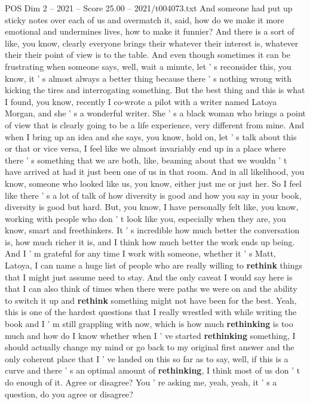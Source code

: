\begin{textsample}{POS Dim 2 – 2021 – Score 25.00 – 2021/t004073.txt}
And someone had put up sticky notes over each of us and overmatch it, said, how do we make it more emotional and undermines lives, how to make it funnier?
And there is a sort of like, you know, clearly everyone brings their whatever their interest is, whatever their their point of view is to the table.
And even though sometimes it can be frustrating when someone says, well, wait a minute, let ' s reconsider this, you know, it ' s almost always a better thing because there ' s nothing wrong with kicking the tires and interrogating something.
But the best thing and this is what I found, you know, recently I co-wrote a pilot with a writer named Latoya Morgan, and she ' s a wonderful writer.
She ' s a black woman who brings a point of view that is clearly going to be a life experience, very different from mine.
And when I bring up an idea and she says, you know, hold on, let ' s talk about this or that or vice versa, I feel like we almost invariably end up in a place where there ' s something that we are both, like, beaming about that we wouldn ' t have arrived at had it just been one of us in that room.
And in all likelihood, you know, someone who looked like us, you know, either just me or just her.
So I feel like there ' s a lot of talk of how diversity is good and how you say in your book, diversity is good but hard.
But, you know, I have personally felt like, you know, working with people who don ' t look like you, especially when they are, you know, smart and freethinkers.
It ' s incredible how much better the conversation is, how much richer it is, and I think how much better the work ends up being.
And I ' m grateful for any time I work with someone, whether it ' s Matt, Latoya, I can name a huge list of people who are really willing to \textbf{rethink} things that I might just assume need to stay.
And the only caveat I would say here is that I can also think of times when there were paths we were on and the ability to switch it up and \textbf{rethink} something might not have been for the best.
Yeah, this is one of the hardest questions that I really wrestled with while writing the book and I ' m still grappling with now, which is how much \textbf{rethinking} is too much and how do I know whether when I ' ve started \textbf{rethinking} something, I should actually change my mind or go back to my original first answer and the only coherent place that I ' ve landed on this so far as to say, well, if this is a curve and there ' s an optimal amount of \textbf{rethinking}, I think most of us don ' t do enough of it.
Agree or disagree?
You ' re asking me, yeah, yeah, it ' s a question, do you agree or disagree?

\end{textsample}
